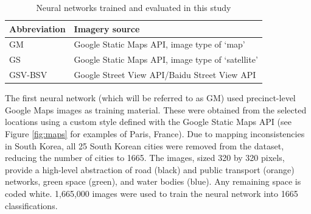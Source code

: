 \documentclass[sageh,times]{sagej}
\begin{document}
\begin{table}[!htbp]
\caption{Neural networks trained and evaluated in this study \label{tab:neuralnetworks}}     
\begin{tabular}{| l | l |}
 \hline Abbreviation   &  Imagery source \\ \hline
GM & Google Static Maps API, image type of `map'     \\ \hline
GS & Google Static Maps API, image type of `satellite'      \\ \hline
GSV-BSV & Google Street View API/Baidu Street View API     \\ \hline

\end{tabular}
\end{table}

The first neural network (which will be referred to as GM) used precinct-level Google Maps images as training material. These were obtained from the selected locations using a custom style defined with the Google Static Maps API \citep{GoogleStatic2017} (see Figure \ref{fig:maps} for examples of Paris, France). Due to mapping inconsistencies in South Korea, all 25 South Korean cities were removed from the dataset, reducing the number of cities to 1665. The images, sized 320 by 320 pixels, provide a high-level abstraction of road (black) and public transport (orange) networks, green space (green), and water bodies (blue). Any remaining space is coded white. 1,665,000 images were used to train the neural network into 1665 classifications.
\end{document}
